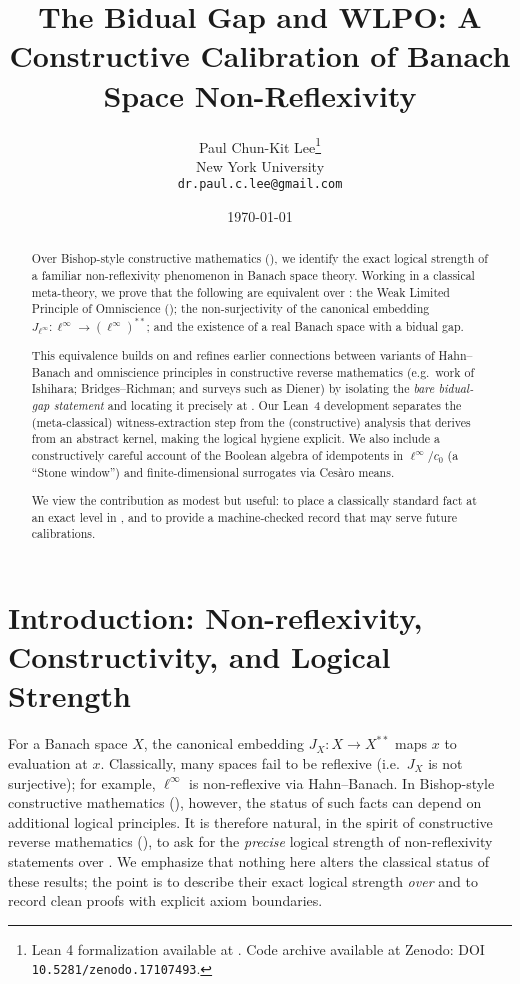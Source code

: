 \documentclass[11pt]{article}
\title{The Bidual Gap and WLPO: A Constructive Calibration of Banach Space Non-Reflexivity}
\author{Paul Chun-Kit Lee\thanks{Lean 4 formalization available at \leanRepo. Code archive available at Zenodo: DOI \texttt{10.5281/zenodo.17107493}.} \\ 
New York University \\ 
\texttt{dr.paul.c.lee@gmail.com}}
\date{\today}
\newcommand{\WLPO}{\mathrm{WLPO}}
\newcommand{\BISH}{\mathrm{BISH}}
\newcommand{\CRM}{\mathrm{CRM}}
\begin{document}
\begin{abstract}
Over Bishop-style constructive mathematics (\BISH), we identify the exact logical strength of a familiar non-reflexivity phenomenon in Banach space theory. Working in a classical meta-theory, we prove that the following are equivalent over \BISH: the Weak Limited Principle of Omniscience (\WLPO); the non-surjectivity of the canonical embedding $J_{\ell^\infty}:\ell^\infty\to(\ell^\infty)^{**}$; and the existence of a real Banach space with a bidual gap. 

This equivalence builds on and refines earlier connections between variants of Hahn--Banach and omniscience principles in constructive reverse mathematics (e.g.\ work of Ishihara; Bridges--Richman; and surveys such as Diener) by isolating the \emph{bare bidual-gap statement} and locating it precisely at \WLPO. Our Lean~4 development separates the (meta-classical) witness-extraction step from the (constructive) analysis that derives \WLPO from an abstract kernel, making the logical hygiene explicit. We also include a constructively careful account of the Boolean algebra of idempotents in $\ell^\infty/c_0$ (a ``Stone window'') and finite-dimensional surrogates via Ces\`{a}ro means. 

We view the contribution as modest but useful: to place a classically standard fact at an exact level in \CRM, and to provide a machine-checked record that may serve future calibrations.
\end{abstract}

\maketitle


\tableofcontents

\section{Introduction: Non-reflexivity, Constructivity, and Logical Strength}

For a Banach space $X$, the canonical embedding $J_X:X\to X^{**}$ maps $x$ to evaluation at $x$. Classically, many spaces fail to be reflexive (i.e.\ $J_X$ is not surjective); for example, $\ell^\infty$ is non-reflexive via Hahn--Banach. In Bishop-style constructive mathematics (\BISH), however, the status of such facts can depend on additional logical principles. It is therefore natural, in the spirit of constructive reverse mathematics (\CRM), to ask for the \emph{precise} logical strength of non-reflexivity statements over \BISH. We emphasize that nothing here alters the classical status of these results; the point is to describe their exact logical strength \emph{over \BISH} and to record clean proofs with explicit axiom boundaries.
\end{document}
